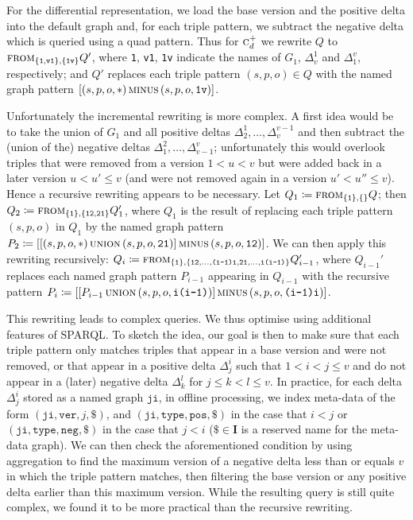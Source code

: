 \documentclass[a4paper]{llncs}
\newcommand{\I}{\ensuremath{\mathbf{I}}\xspace}
\newcommand{\ssyn}[3]{[\ensuremath{#1\,\textsc{#2}\,#3}]}
\newcommand{\suni}[2]{\ssyn{#1}{union}{#2}}
\newcommand{\sminus}[2]{\ssyn{#1}{minus}{#2}}
\newcommand{\sfrom}[3]{\ensuremath{\textsc{from}_{#2,#3}#1}}
\begin{document}
For the differential representation, we load the base version and the positive delta into the default graph and, for each triple pattern, we subtract the negative delta which is queried using a quad pattern. Thus for $\textsc{c}_d^{+}$ we rewrite $Q$ to  \sfrom{Q'}{\{\texttt{1},\texttt{v1}\}}{\{\texttt{1v}\}}, where \texttt{1}, \texttt{v1}, \texttt{1v} indicate the names of $G_1$, $\Delta_v^1$ and $\Delta_1^v$, respectively; and $Q'$ replaces each triple pattern $(s,p,o) \in Q$ with the named graph pattern $\sminus{(s,p,o,*)}{(s,p,o,\texttt{1v})}$. 

Unfortunately the incremental rewriting is more complex. A first idea would be to take the union of $G_1$ and all positive deltas $\Delta_2^1, \ldots, \Delta_v^{v-1}$ and then subtract the (union of the) negative deltas $\Delta_1^2, \ldots, \Delta_{v-1}^{v}$; unfortunately this would overlook triples that were removed from a version $1 < u < v$ but were added back in a later version $u < u' \leq v$ (and were not removed again in a version $u' < u'' \leq v$). Hence a recursive rewriting appears to be necessary. Let $Q_1 \coloneqq \sfrom{Q}{\{\texttt{1}\}}{\{\}}$; then $Q_2 \coloneqq \sfrom{Q'_1}{\{\texttt{1}\}}{\{\texttt{12},\texttt{21}\}}$, where $Q_1$ is the result of replacing each triple pattern $(s,p,o)$ in $Q_1$ by the named graph pattern $P_2 \coloneqq \sminus{\suni{(s,p,o,*)}{(s,p,o,\texttt{21})}}{(s,p,o,\texttt{12})}$. We can then apply this rewriting recursively: $Q_i \coloneqq \sfrom{Q_{i-1}'}{\{\texttt{1}\}}{\{\texttt{12},\ldots,\texttt{(i-1)i},\texttt{21},\ldots,\texttt{i(i-1)}\}}$, where $Q_{i-1}'$ replaces each named graph pattern $P_{i-1}$ appearing in $Q_{i-1}$ with the recursive pattern $P_i \coloneqq \sminus{\suni{P_{i-1}}{(s,p,o,\texttt{i(i-1)})}}{(s,p,o,\texttt{(i-1)i})}$.

This rewriting leads to complex queries. We thus optimise using additional features of SPARQL. To sketch the idea, our goal is then to make sure that each triple pattern only matches triples that appear in a base version and were not removed, or that appear in a positive delta $\Delta_{j}^{i}$ such that $1 < i < j \leq v$ and do not appear in a (later) negative delta $\Delta_{k}^{l}$ for $j \leq k < l \leq v$. In practice, for each delta $\Delta_{j}^{i}$ stored as a named graph $\texttt{ji}$, in offline processing, we index meta-data of the form $(\texttt{ji},\texttt{ver},j,\texttt{\$})$, and $(\texttt{ji},\texttt{type},\texttt{pos},\texttt{\$})$ in the case that $i < j$ or $(\texttt{ji},\texttt{type},\texttt{neg},\texttt{\$})$ in the case that $j < i$ ($\texttt{\$} \in \I$ is a reserved name for the meta-data graph). We can then check the aforementioned condition by using aggregation to find the maximum version of a negative delta less than or equals $v$ in which the triple pattern matches, then filtering the base version or any positive delta earlier than this maximum version. While the resulting query is still quite complex, we found it to be more practical than the recursive rewriting.
\end{document}
